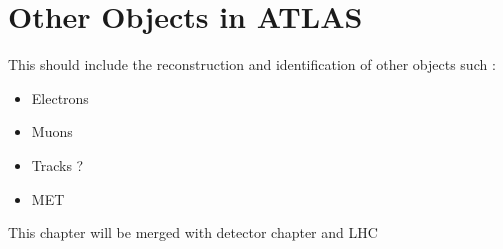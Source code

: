 \newpage
\chapter{Other Objects in ATLAS}
\label{obj}

This should include the reconstruction and identification of other objects such :
\begin{itemize}
    \item Electrons 
    \item Muons 
    \item Tracks ?
    \item MET
\end{itemize}

This chapter will be merged with detector chapter and LHC